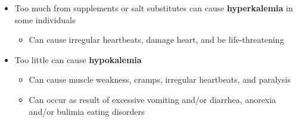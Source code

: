 \documentclass[12pt]{article}
\begin{document}
\begin{itemize}
\begin{itemize}
                        \item Too much from supplements or salt substitutes can cause \textbf{hyperkalemia} in some individuals
                            \begin{itemize}
                                \item Can cause irregular heartbeats, damage heart, and be life-threatening
                            \end{itemize}
                        \item Too little can cause \textbf{hypokalemia}
                            \begin{itemize}
                                \item Can cause muscle weakness, cramps, irregular heartbeats, and paralysis
                                \item Can occur as result of excessive vomiting and/or diarrhea, anorexia and/or bulimia eating disorders
                            \end{itemize}
                    \end{itemize}
            \end{itemize}
\end{document}
